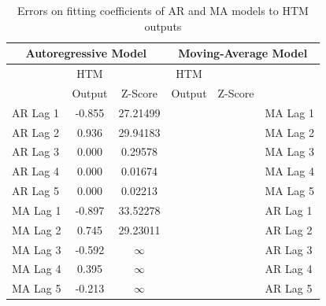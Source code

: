 \documentclass[oneside,12pt,openany]{book}
\begin{document}
    \begin{table}[!ht]
        \centering
        \begin{tabular}{|l|c|c|c|c|l|}
            \hline
            \multicolumn{3}{|c|}{Autoregressive Model} & \multicolumn{3}{c|}{Moving-Average Model} \\ \hline
            \cellcolor{black} & HTM & & HTM &  & \cellcolor{black} \\
            \cellcolor{black} & Output & Z-Score & Output & Z-Score & \cellcolor{black} \\ \hline
            AR Lag 1 & -0.855 & 27.21499 &  &  & MA Lag 1 \\ \hline
            AR Lag 2 & 0.936 & 29.94183 &  &  & MA Lag 2 \\ \hline
            AR Lag 3 & 0.000 & 0.29578 &  &  & MA Lag 3 \\ \hline
            AR Lag 4 & 0.000 & 0.01674 &  &  & MA Lag 4 \\ \hline
            AR Lag 5 & 0.000 & 0.02213 &  &  & MA Lag 5 \\ \hline
            MA Lag 1 & -0.897 & 33.52278 &  &  & AR Lag 1 \\ \hline
            MA Lag 2 & 0.745 & 29.23011 &  &  & AR Lag 2 \\ \hline
            MA Lag 3 & -0.592 & $\infty$ &  &  & AR Lag 3 \\ \hline
            MA Lag 4 & 0.395 & $\infty$ &  &  & AR Lag 4 \\ \hline
            MA Lag 5 & -0.213 & $\infty$ &  &  & AR Lag 5 \\ \hline
        \end{tabular}
        \caption{Errors on fitting coefficients of AR and MA models to HTM outputs}
        \label{tab:HTMARMAError3Lite}
    \end{table}
		
\end{document}
